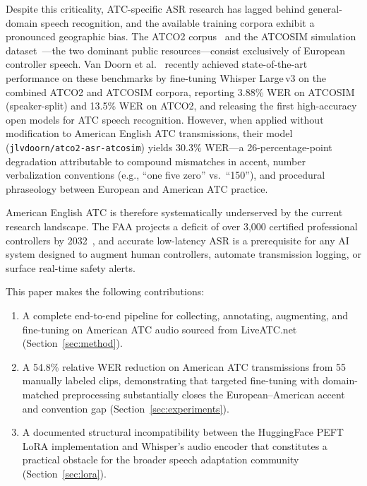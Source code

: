 \documentclass[11pt,a4paper]{article}
\begin{document}
Despite this criticality, ATC-specific ASR research has lagged behind
general-domain speech recognition, and the available training corpora exhibit
a pronounced geographic bias. The ATCO2 corpus~\cite{kocour2021atco2} and the
ATCOSIM simulation dataset~\cite{zuluagagomez2022atcosim}---the two dominant
public resources---consist exclusively of European controller speech. Van Doorn
et al.~\cite{vandoorn2024whisperatc} recently achieved state-of-the-art
performance on these benchmarks by fine-tuning Whisper Large\,v3 on the
combined ATCO2 and ATCOSIM corpora, reporting 3.88\% WER on ATCOSIM
(speaker-split) and 13.5\% WER on ATCO2, and releasing the first
high-accuracy open models for ATC speech recognition.
However, when applied without modification to American English ATC
transmissions, their model (\texttt{jlvdoorn/atco2-asr-atcosim}) yields
30.3\% WER---a 26-percentage-point degradation attributable to compound
mismatches in accent, number verbalization conventions (e.g., ``one five zero''
vs.\ ``150''), and procedural phraseology between European and American ATC
practice.

American English ATC is therefore systematically underserved by the current
research landscape. The FAA projects a deficit of over 3,000 certified
professional controllers by 2032~\cite{faashortage2023}, and accurate
low-latency ASR is a prerequisite for any AI system designed to augment human
controllers, automate transmission logging, or surface real-time safety alerts.

This paper makes the following contributions:
\begin{enumerate}[noitemsep]
  \item A complete end-to-end pipeline for collecting, annotating, augmenting,
        and fine-tuning on American ATC audio sourced from LiveATC.net
        (Section~\ref{sec:method}).
  \item A 54.8\% relative WER reduction on American ATC transmissions from 55
        manually labeled clips, demonstrating that targeted fine-tuning with
        domain-matched preprocessing substantially closes the
        European--American accent and convention gap
        (Section~\ref{sec:experiments}).
  \item A documented structural incompatibility between the HuggingFace PEFT
        LoRA implementation and Whisper's audio encoder that constitutes a
        practical obstacle for the broader speech adaptation community
        (Section~\ref{sec:lora}).
\end{enumerate}
\end{document}
